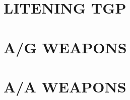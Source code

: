 \documentclass[fontHelvetica]{TechCheck}
\begin{document}
	\cleardoublepage

	\chapter{LITENING TGP}
	\minitoc
	\cleardoublepage

	\cleardoublepage

	\chapter{A/G WEAPONS}
	\minitoc
	\cleardoublepage

	\cleardoublepage

	\chapter{A/A WEAPONS}
	\minitoc
	\cleardoublepage


  \cleardoublepage

\iftoggle{print}{
	\pagestyle{empty}
	\newpage \null
	\thumbwide
	\newpage \null
}{}
\end{document}
